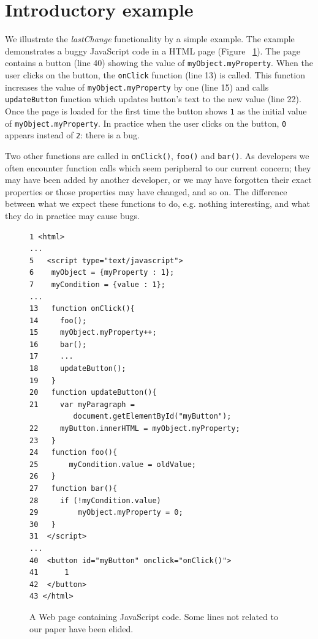 \documentclass[preprint]{sigplanconf}
\begin{document}
\section{Introductory example}
\label{sec:introExample}

We illustrate the \textit{lastChange} functionality by a simple
example. The example demonstrates a buggy JavaScript code in a HTML
page (Figure ~\ref{fig:js-code}). The page contains a button (line 40)
showing the value of \texttt{myObject.myProperty}.  When the user
clicks on the button, the \texttt{onClick} function (line 13) is
called. This function increases the value of
\texttt{myObject.myProperty} by one (line 15) and calls
\texttt{updateButton} function which updates button's text to the new
value (line 22).  Once the page is loaded for the first time the
button shows \texttt{1} as the initial value of
\texttt{myObject.myProperty}.  In practice when the user clicks on the
button, \texttt{0} appears instead of \texttt{2}: there is a bug.

Two other functions are called in \texttt{onClick()}, \texttt{foo()}
and \texttt{bar()}. As developers we often encounter function calls
which seem peripheral to our current concern; they may have been added
by another developer, or we may have forgotten their exact properties
or those properties may have changed, and so on. The difference
between what we expect these functions to do, e.g. nothing
interesting, and what they do in practice may cause bugs.


\begin{figure}[htp]
\begin{verbatim}
1 <html>
...
5   <script type="text/javascript">
6    myObject = {myProperty : 1};
7    myCondition = {value : 1};
...
13   function onClick(){
14     foo();
15     myObject.myProperty++;
16     bar();
17     ...
18     updateButton();
19   }
20   function updateButton(){
21     var myParagraph =
          document.getElementById("myButton");
22     myButton.innerHTML = myObject.myProperty;
23   }   
24   function foo(){
25  	 myCondition.value = oldValue;
26   }  
27   function bar(){ 
28     if (!myCondition.value)
29         myObject.myProperty = 0;
30   }
31  </script> 
...
40  <button id="myButton" onclick="onClick()">
41  	1 
42  </button>
43 </html>
\end{verbatim}
\caption{A Web page containing JavaScript code. Some lines not related to our paper have been elided.}
\label{fig:js-code}
\end{figure}
\end{document}
